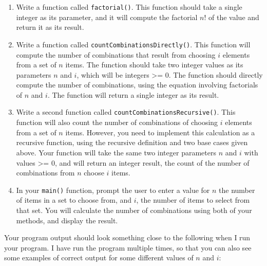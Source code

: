 \documentclass[11pt]{article}
\begin{document}
\begin{enumerate}
\item Write a function called \verb~factorial()~.  This function should take a
single integer as its parameter, and it will compute the factorial
$n!$ of the value and return it as its result.

\item Write a function called \verb~countCombinationsDirectly()~.  This
function will compute the number of combinations that result from
choosing $i$ elements from a set of $n$ items.  The function should
take two integer values as its parameters $n$ and $i$, which will
be integers >= 0.  The function should directly compute the number
of combinations, using the equation involving factorials of $n$ and
$i$.  The function will return a single integer as its result.

\item Write a second function called \verb~countCombinationsRecursive()~.
This function will also count the number of combinations of
choosing $i$ elements from a set of $n$ items.  However, you need
to implement this calculation as a recursive function, using the
recursive definition and two base cases given above.  Your function
will take the same two integer parameters $n$ and $i$ with values
>= 0, and will return an integer result, the count of the number of
combinations from $n$ choose $i$ items.

\item In your \verb~main()~ function, prompt the user to enter a value for $n$
the number of items in a set to choose from, and $i$, the number of
items to select from that set.  You will calculate the number of
combinations using both of your methods, and display the result.
\end{enumerate}

Your program output should look something close to the following when I
run your program.  I have run the program multiple times, so that you
can also see some examples of correct output for some different values
of $n$ and $i$:
\end{document}
